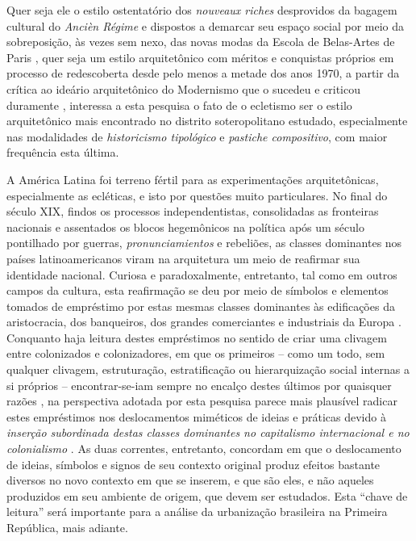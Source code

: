 Quer seja ele o estilo ostentatório dos \textit{nouveaux riches} desprovidos da bagagem cultural do \textit{Ancièn Régime} e dispostos a demarcar seu espaço social por meio da sobreposição, às vezes sem nexo, das novas modas da Escola de Belas-Artes de Paris \cite[pp.~315-319]{guerrand_espacos_2009}, quer seja um estilo arquitetônico com méritos e conquistas próprios em processo de redescoberta desde pelo menos a metade dos anos 1970, a partir da crítica ao ideário arquitetônico do Modernismo que o sucedeu e criticou duramente \cite{almeida_victoria_1997, almeida_vitrinescomercio_2014, patetta_ecletismo_1987, puppi_hisnamod_1998}, interessa a esta pesquisa o fato de o ecletismo ser o estilo arquitetônico mais encontrado no distrito soteropolitano estudado, especialmente nas modalidades de \textit{historicismo tipológico} e \textit{pastiche compositivo}, com maior frequência esta última.

A América Latina foi terreno fértil para as experimentações arquitetônicas, especialmente as ecléticas, e isto por questões muito particulares. No final do século XIX, findos os processos independentistas, consolidadas as fronteiras nacionais e assentados os blocos hegemônicos na política após um século pontilhado por guerras, \textit{pronunciamientos} e rebeliões, as classes dominantes nos países latinoamericanos viram na arquitetura um meio de reafirmar sua identidade nacional. Curiosa e paradoxalmente, entretanto, tal como em outros campos da cultura, esta reafirmação se deu por meio de símbolos e elementos tomados de empréstimo por estas mesmas classes dominantes às edificações da aristocracia, dos banqueiros, dos grandes comerciantes e industriais da Europa \cite[pp.~403-406]{gutierrez_arquibero_1983}. Conquanto haja leitura destes empréstimos no sentido de criar uma clivagem entre colonizados e colonizadores, em que os primeiros -- como um todo, sem qualquer clivagem, estruturação, estratificação ou hierarquização social internas a si próprios -- encontrar-se-iam sempre no encalço destes últimos por quaisquer razões \cite{bhabha_local_1998,memmi_coloniza_1967}, na perspectiva adotada por esta pesquisa parece mais plausível radicar estes empréstimos nos deslocamentos miméticos de ideias e práticas devido à \textit{inserção subordinada destas classes dominantes no capitalismo internacional e no colonialismo} \cite{schwarz_ideias_1973}. As duas correntes, entretanto, concordam em que o deslocamento de ideias, símbolos e signos de seu contexto original produz efeitos bastante diversos no novo contexto em que se inserem, e que são eles, e não aqueles produzidos em seu ambiente de origem, que devem ser estudados. Esta ``chave de leitura'' será importante para a análise da urbanização brasileira na Primeira República, mais adiante.

